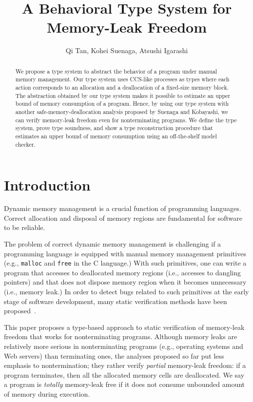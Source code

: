 \documentclass[english]{jssst_ppl} %
\title{A Behavioral Type System for \\ Memory-Leak Freedom}
\author{Qi Tan, Kohei Suenaga, Atsushi Igarashi}
\theoremstyle{definition}
\begin{document}
\maketitle
\begin{abstract}
We propose a type system to abstract the behavior of a program under
manual memory management. Our type system uses CCS-like processes as
types where each action corresponds to an allocation and a
deallocation of a fixed-size memory block. The abstraction obtained by
our type system makes it possible to estimate an upper bound of memory
consumption of a program. Hence, by using our type system with another
safe-memory-deallocation analysis proposed by Suenaga and Kobayashi,
we can verify memory-leak freedom even for nonterminating programs.
We define the type system, prove type soundness, and show a type
reconstruction procedure that estimates an upper bound of memory
consumption using an off-the-shelf model checker.
\end{abstract}

\section{Introduction}

Dynamic memory management is a crucial function of programming
languages.  Correct allocation and disposal of memory regions are
fundamental for software to be reliable.

The problem of correct dynamic memory management is challenging if a
programming language is equipped with manual memory management
primitives (e.g., \texttt{malloc} and \texttt{free} in the C
language.)  With such primitives, one can write a program that
accesses to deallocated memory regions (i.e., accesses to dangling
pointers) and that does not dispose memory region when it becomes
unnecessary (i.e., memory leak.)  In order to detect bugs related to
such primitives at the early stage of software development, many
static verification methods have been proposed~\cite{}.

This paper proposes a type-based approach to static verification of
memory-leak freedom that works for nonterminating programs.  Although
memory leaks are relatively more serious in nonterminating programs
(e.g., operating systems and Web servers) than terminating ones, the
analyses proposed so far put less emphasis to nontermination; they
rather verify \emph{partial} memory-leak freedom: if a program
terminates, then all the allocated memory cells are deallocated.  We
say a program is \emph{totally} memory-leak free if it does not
consume unbounded amount of memory during execution.
\end{document}
